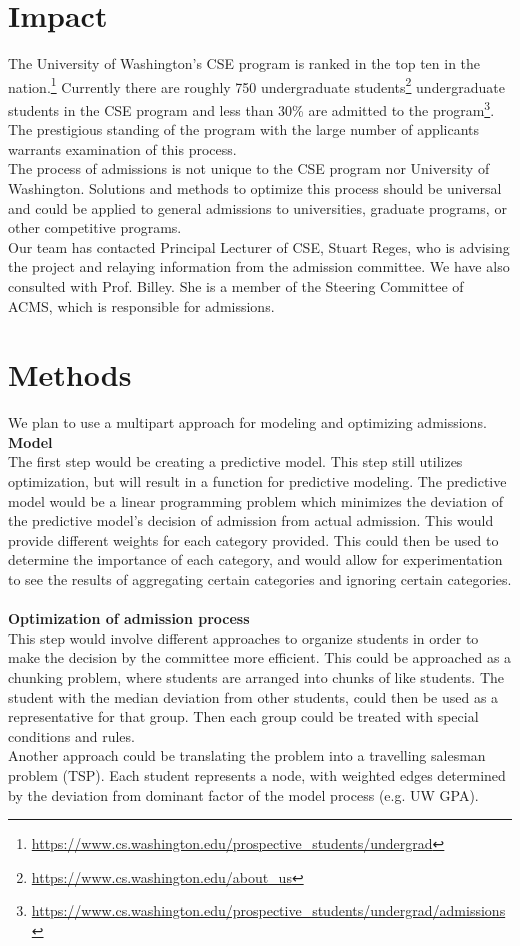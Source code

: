 \documentclass[11pt]{article}
\begin{document}
\section{Impact}

The University of Washington's CSE program is ranked in the top ten in the nation.\footnote{\url{https://www.cs.washington.edu/prospective_students/undergrad}} Currently there are roughly 750 undergraduate students\footnote{\url{https://www.cs.washington.edu/about_us}} undergraduate students in the CSE program and less than 30\% are admitted to the program\footnote{\url{https://www.cs.washington.edu/prospective_students/undergrad/admissions}}. The prestigious standing of the program with the large number of applicants warrants examination of this process.
\\
\indent The process of admissions is not unique to the CSE program nor University of Washington. Solutions and methods to optimize this process should be universal and could be applied to general admissions to universities, graduate programs, or other competitive programs.
\\
\indent Our team has contacted Principal Lecturer of CSE, Stuart Reges, who is advising the project and relaying information from the admission committee. We have also consulted with Prof. Billey. She is a member of the Steering Committee of ACMS, which is responsible for admissions.

\section{Methods}

We plan to use a multipart approach for modeling and optimizing admissions. 
\\
\textbf {Model}
\\
The first step would be creating a predictive model. This step still utilizes optimization, but will result in a function for predictive modeling. The predictive model would be a linear programming problem which minimizes the deviation of the predictive model's decision of admission from actual admission. This would provide different weights for each category provided. This could then be used to determine the importance of each category, and would allow for experimentation to see the results of aggregating certain categories and ignoring certain categories.
\\\\
\textbf {Optimization of admission process}
\\
This step would involve different approaches to organize students in order to make the decision by the committee more efficient. This could be approached as a chunking problem, where students are arranged into chunks of like students. The student with the median deviation from other students, could then be used as a representative for that group. Then each group could be treated with special conditions and rules.
\\ \indent Another approach could be translating the problem into a travelling salesman problem (TSP). Each student represents a node, with weighted edges determined by the deviation from dominant factor of the model process (e.g. UW GPA).
\end{document}
